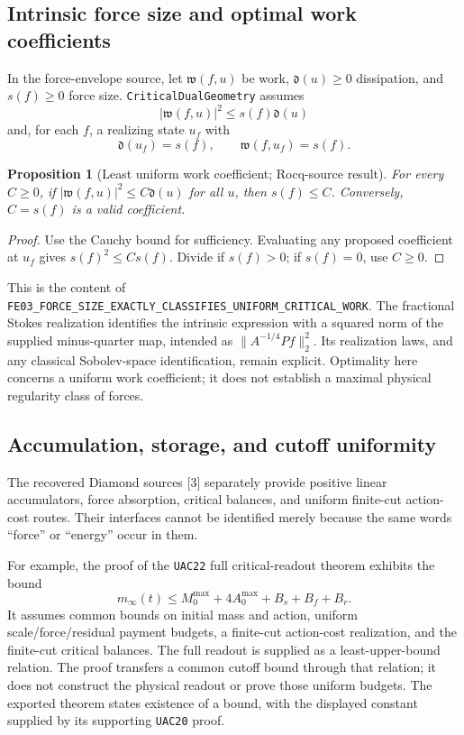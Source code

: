 \documentclass[11pt,a4paper]{article}
\newtheorem{proposition}{Proposition}[section]
\theoremstyle{remark}\newtheorem{remark}[proposition]{Remark}
\newcommand{\code}[1]{\nolinkurl{#1}}
\newcommand{\rocq}{\textsf{Rocq-source result}}
\begin{document}
\subsection{Intrinsic force size and optimal work coefficients}
In the force-envelope source, let $\mathfrak w(f,u)$ be work, $\mathfrak d(u)\ge0$ dissipation, and $s(f)\ge0$ force size. \code{CriticalDualGeometry} assumes
\[
 |\mathfrak w(f,u)|^2\le s(f)\mathfrak d(u)
\]
and, for each $f$, a realizing state $u_f$ with
\[
 \mathfrak d(u_f)=s(f),\qquad \mathfrak w(f,u_f)=s(f).
\]
\begin{proposition}[Least uniform work coefficient; \rocq]
For every $C\ge0$, if $|\mathfrak w(f,u)|^2\le C\mathfrak d(u)$ for all $u$, then $s(f)\le C$. Conversely, $C=s(f)$ is a valid coefficient.
\end{proposition}
\begin{proof}
Use the Cauchy bound for sufficiency. Evaluating any proposed coefficient at $u_f$ gives $s(f)^2\le Cs(f)$. Divide if $s(f)>0$; if $s(f)=0$, use $C\ge0$.
\end{proof}
This is the content of \code{FE03_FORCE_SIZE_EXACTLY_CLASSIFIES_UNIFORM_CRITICAL_WORK}. The fractional Stokes realization identifies the intrinsic expression with a squared norm of the supplied minus-quarter map, intended as $\|A^{-1/4}Pf\|_2^2$. Its realization laws, and any classical Sobolev-space identification, remain explicit. Optimality here concerns a uniform work coefficient; it does not establish a maximal physical regularity class of forces.

\subsection{Accumulation, storage, and cutoff uniformity}
The recovered Diamond sources [3] separately provide positive linear accumulators, force absorption, critical balances, and uniform finite-cut action-cost routes. Their interfaces cannot be identified merely because the same words ``force'' or ``energy'' occur in them.

For example, the proof of the \code{UAC22} full critical-readout theorem exhibits the bound
\[
 m_\infty(t)\le M_0^{\max}+4A_0^{\max}+B_s+B_f+B_r.
\]
It assumes common bounds on initial mass and action, uniform scale/force/residual payment budgets, a finite-cut action-cost realization, and the finite-cut critical balances. The full readout is supplied as a least-upper-bound relation. The proof transfers a common cutoff bound through that relation; it does not construct the physical readout or prove those uniform budgets. The exported theorem states existence of a bound, with the displayed constant supplied by its supporting \code{UAC20} proof.
\end{document}

